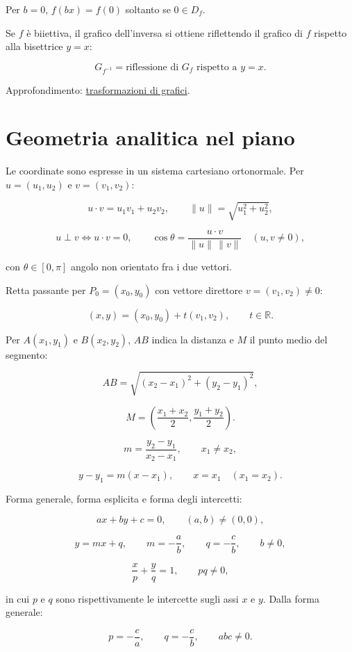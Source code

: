 Per \(b=0\), \(f(bx)=f(0)\) soltanto se \(0\in D_f\).

Se \(f\) è biiettiva, il grafico dell'inversa si ottiene riflettendo il grafico di \(f\) rispetto alla bisettrice \(y=x\):

\[
G_{f^{-1}}=\text{riflessione di }G_f\text{ rispetto a }y=x.
\]

Approfondimento: \href{https://ingegnerismo.it/matematica/trasformazioni-di-grafici/}{trasformazioni di grafici}.

\section{Geometria analitica nel piano}\label{geometria-analitica-nel-piano}

Le coordinate sono espresse in un sistema cartesiano ortonormale. Per \(u=(u_1,u_2)\) e \(v=(v_1,v_2)\):

\[
u\cdot v=u_1v_1+u_2v_2,
\qquad
\lVert u\rVert=\sqrt{u_1^2+u_2^2},
\]

\[
u\perp v\Longleftrightarrow u\cdot v=0,
\qquad
\cos\theta=\frac{u\cdot v}{\lVert u\rVert\,\lVert v\rVert}
\quad(u,v\ne0),
\]

con \(\theta\in[0,\pi]\) angolo non orientato fra i due vettori.

Retta passante per \(P_0=(x_0,y_0)\) con vettore direttore \(v=(v_1,v_2)\ne0\):

\[
(x,y)=(x_0,y_0)+t(v_1,v_2),
\qquad t\in\mathbb R.
\]

Per \(A(x_1,y_1)\) e \(B(x_2,y_2)\), \(AB\) indica la distanza e \(M\) il punto medio del segmento:

\[
AB=\sqrt{(x_2-x_1)^2+(y_2-y_1)^2},
\]

\[
M=\left(\frac{x_1+x_2}{2},\frac{y_1+y_2}{2}\right).
\]

\[
m=\frac{y_2-y_1}{x_2-x_1},
\qquad x_1\ne x_2,
\]

\[
y-y_1=m(x-x_1),
\qquad
x=x_1\quad(x_1=x_2).
\]

Forma generale, forma esplicita e forma degli intercetti:

\[
ax+by+c=0,
\qquad (a,b)\ne(0,0),
\]

\[
y=mx+q,
\qquad
m=-\frac ab,
\qquad
q=-\frac cb,
\qquad b\ne0,
\]

\[
\frac xp+\frac yq=1,
\qquad pq\ne0,
\]

in cui \(p\) e \(q\) sono rispettivamente le intercette sugli assi \(x\) e \(y\). Dalla forma generale:

\[
p=-\frac ca,
\qquad
q=-\frac cb,
\qquad
abc\ne0.
\]

